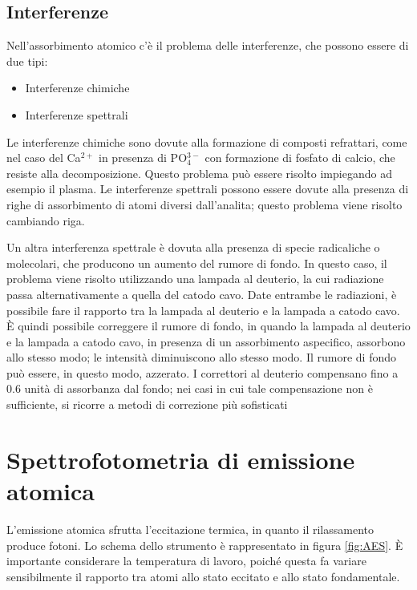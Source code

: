 \subsection{Interferenze}

Nell'assorbimento atomico c'è il problema delle interferenze, che possono essere di due tipi:
\begin{itemize}
\item Interferenze chimiche
\item Interferenze spettrali
\end{itemize}

Le interferenze chimiche sono dovute alla formazione di composti refrattari, come nel caso del Ca$^{2+}$ in presenza di PO$_4^{3-}$ con formazione di fosfato di calcio, che resiste alla decomposizione.
Questo problema può essere risolto impiegando ad esempio il plasma.
Le interferenze spettrali possono essere dovute alla presenza di righe di assorbimento di atomi diversi dall'analita; questo problema viene risolto cambiando riga.


Un altra interferenza spettrale è dovuta alla presenza di specie radicaliche o molecolari, che producono un aumento del rumore di fondo.
In questo caso, il problema viene risolto utilizzando una lampada al deuterio, la cui radiazione passa alternativamente a quella del catodo cavo.
Date entrambe le radiazioni, è possibile fare il rapporto tra la lampada al deuterio e la lampada a catodo cavo.
È quindi possibile correggere il rumore di fondo, in quando la lampada al deuterio e la lampada a catodo cavo, in presenza di un assorbimento aspecifico, assorbono allo stesso modo; le intensità diminuiscono allo stesso modo.
Il rumore di fondo può essere, in questo modo, azzerato.
I correttori al deuterio compensano fino a 0.6 unità di assorbanza dal fondo; nei casi in cui tale compensazione non è sufficiente, si ricorre a metodi di correzione più sofisticati


\section{Spettrofotometria di emissione atomica}
L'emissione atomica sfrutta l'eccitazione termica, in quanto il rilassamento produce fotoni.
Lo schema dello strumento è rappresentato in figura \ref{fig:AES}.
È importante considerare la temperatura di lavoro, poiché questa fa variare sensibilmente il rapporto tra atomi allo stato eccitato e allo stato fondamentale.

